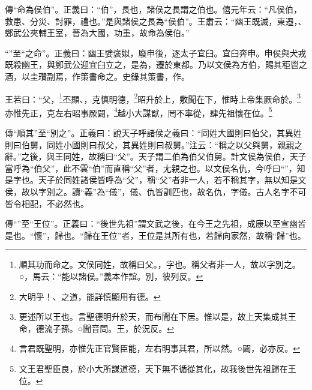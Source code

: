 {\noindent\zhuan{}\fzbyks 傳“命為侯伯”。正義曰：“伯”，長也，諸侯之長謂之伯也。僖元年云：“凡侯伯，救患、分災、討罪，禮也。”是與諸侯之長為“侯伯”。王肅云：“幽王既滅，東遷，、鄭武公夾輔王室，晉為大國，功重，故命為侯伯。” \par}

{\noindent\shu{}\fzkt “”至“之命”。正義曰：幽王嬖褒姒，廢申後，逐太子宜臼。宜臼奔申。申侯與犬戎既殺幽王，與鄭武公迎宜臼立之，是為，遷於東都。乃以文侯為方伯，賜其秬鬯之酒，以圭瓚副焉，作策書命之。史錄其策書，作。 \par}

王若曰：“父，\footnote{順其功而命之。文侯同姓，故稱曰父。，字也。稱父者非一人，故以字別之。○，馬云：“能以諸侯。”義本作誼。別，彼列反。}丕顯、，克慎明德，\footnote{大明乎！、之道，能詳慎顯用有德。}昭升於上，敷聞在下，惟時上帝集厥命於。\footnote{更述所以王也。言聖德明升於天，而布聞在下居。惟以是，故上天集成其王命，德流子孫。○聞音問。王，於況反。}亦惟先正，克左右昭事厥闢，\footnote{言君既聖明，亦惟先正官賢臣能，左右明事其君，所以然。○闢，必亦反。}越小大謀猷，罔不率從，肆先祖懷在位。\footnote{文王君聖臣良，於小大所謀道德，天下無不循從其化，故我後世先祖歸在王位。}


{\noindent\zhuan{}\fzbyks 傳“順其”至“別之”。正義曰：說天子呼諸侯之義曰：“同姓大國則曰伯父，其異姓則曰伯舅，同姓小國則曰叔父，其異姓則曰叔舅。”注云：“稱之以父與舅，親親之辭。”之後，與王同姓，故稱曰“父”。天子謂二伯為伯父伯舅。計文侯為侯伯，天子當呼為“伯父”，此不雲“伯”而直稱“父”者，尢親之也。以文侯名仇，今呼曰“”，知是字也。天子於同姓諸侯皆呼為“父”，稱“父”者非一人，若不稱其字，無以知是文侯，故以字別之。讀“義”為“儀”，儀、仇皆訓匹也，故名仇，字儀。古人名字不可皆令相配，不必然也。 \par}

{\noindent\zhuan{}\fzbyks 傳“”至“王位”。正義曰：“後世先祖”謂文武之後，在今王之先祖，成康以至宣幽皆是也。“懷”，歸也。“歸在王位”者，王位是其所有也，若歸向家然，故稱“歸”也。 \par}

